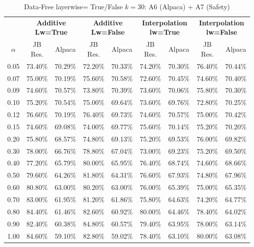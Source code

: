 \begin{table}[h]
\centering
\caption{Data-Free layerwise= True/False $k=30$: A6 (Alpaca) + A7 (Safety)}
\label{tab:res_a6_data_free_30}
\begin{tabular}{c|cc|cc|cc|cc}
\hline
 & \multicolumn{2}{c|}{\textbf{Additive Lw=True}} & \multicolumn{2}{c|}{\textbf{Additive Lw=False}} & \multicolumn{2}{c|}{\textbf{Interpolation lw=True}}& \multicolumn{2}{c}{\textbf{Interpolation lw=False}} \\
$\alpha$ & JB Res. & Alpaca & JB Res. & Alpaca & JB Res. & Alpaca & JB Res. & Alpaca \\
\hline
0.05 & 73.40\% & 70.29\% & 72.20\% & 70.33\% & 74.20\% & 70.30\% & 76.40\% & 70.44\% \\
0.07 & 75.00\% & 70.19\% & 75.60\% & 70.58\% & 72.60\% & 70.45\% & 74.60\% & 70.40\% \\
0.09 & 74.60\% & 70.57\% & 73.80\% & 70.39\% & 73.60\% & 70.06\% & 75.80\% & 70.30\% \\
0.10 & 75.20\% & 70.54\% & 75.00\% & 69.64\% & 73.60\% & 69.76\% & 72.80\% & 70.25\% \\
0.12 & 76.60\% & 70.19\% & 76.40\% & 69.73\% & 74.60\% & 70.57\% & 75.00\% & 70.42\% \\
0.15 & 74.60\% & 69.08\% & 74.00\% & 69.77\% & 75.60\% & 70.14\% & 75.20\% & 70.20\% \\
0.20 & 75.80\% & 68.57\% & 74.80\% & 69.13\% & 75.20\% & 69.53\% & 76.00\% & 69.82\% \\
0.30 & 78.00\% & 66.76\% & 78.80\% & 67.04\% & 73.00\% & 69.23\% & 75.20\% & 69.50\% \\
0.40 & 77.20\% & 65.79\% & 80.00\% & 65.95\% & 76.40\% & 68.74\% & 74.60\% & 68.66\% \\
0.50 & 79.60\% & 64.26\% & 81.80\% & 64.31\% & 76.60\% & 67.93\% & 74.80\% & 67.96\% \\
0.60 & 80.80\% & 63.00\% & 80.20\% & 63.00\% & 76.00\% & 65.39\% & 75.00\% & 65.35\% \\
0.70 & 83.00\% & 61.95\% & 81.20\% & 61.86\% & 75.80\% & 64.63\% & 74.20\% & 64.77\% \\
0.80 & 84.40\% & 61.46\% & 82.60\% & 60.92\% & 80.00\% & 64.46\% & 78.40\% & 64.02\% \\
0.90 & 82.40\% & 60.38\% & 84.80\% & 60.57\% & 79.40\% & 63.95\% & 78.00\% & 63.14\% \\
1.00 & 84.60\% & 59.10\% & 82.80\% & 59.02\% & 78.40\% & 63.10\% & 80.00\% & 63.08\% \\
\hline
\end{tabular}
\end{table}
\FloatBarrier

